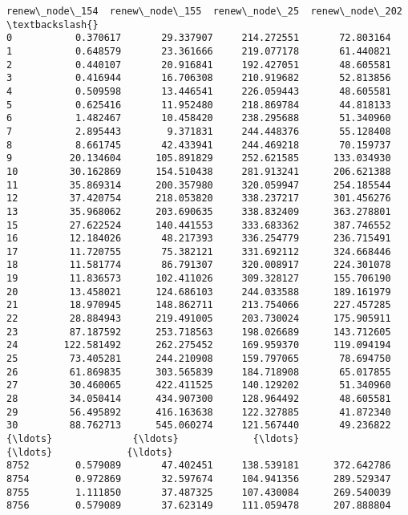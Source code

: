 \documentclass[11pt]{article}
\begin{document}
\begin{Verbatim}[commandchars=\\\{\}]
      renew\_node\_154  renew\_node\_155  renew\_node\_25  renew\_node\_202  \textbackslash{}
0           0.370617       29.337907     214.272551       72.803164   
1           0.648579       23.361666     219.077178       61.440821   
2           0.440107       20.916841     192.427051       48.605581   
3           0.416944       16.706308     210.919682       52.813856   
4           0.509598       13.446541     226.059443       48.605581   
5           0.625416       11.952480     218.869784       44.818133   
6           1.482467       10.458420     238.295688       51.340960   
7           2.895443        9.371831     244.448376       55.128408   
8           8.661745       42.433941     244.469218       70.159737   
9          20.134604      105.891829     252.621585      133.034930   
10         30.162869      154.510438     281.913241      206.621388   
11         35.869314      200.357980     320.059947      254.185544   
12         37.420754      218.053820     338.237217      301.456276   
13         35.968062      203.690635     338.832409      363.278801   
15         27.622524      140.441553     333.683362      387.746552   
16         12.184026       48.217393     336.254779      236.715491   
17         11.720755       75.382121     331.692112      324.668446   
18         11.581774       86.791307     320.008917      224.301078   
19         11.836573      102.411026     309.328127      155.706190   
20         13.458021      124.686103     244.033588      189.161979   
21         18.970945      148.862711     213.754066      227.457285   
22         28.884943      219.491005     203.730024      175.905911   
23         87.187592      253.718563     198.026689      143.712605   
24        122.581492      262.275452     169.959370      119.094194   
25         73.405281      244.210908     159.797065       78.694750   
26         61.869835      303.565839     184.718908       65.017855   
27         30.460065      422.411525     140.129202       51.340960   
28         34.050414      434.907300     128.964492       48.605581   
29         56.495892      416.163638     122.327885       41.872340   
30         88.762713      545.060274     121.567440       49.236822   
{\ldots}              {\ldots}             {\ldots}            {\ldots}             {\ldots}   
8752        0.579089       47.402451     138.539181      372.642786   
8754        0.972869       32.597674     104.941356      289.529347   
8755        1.111850       37.487325     107.430084      269.540039   
8756        0.579089       37.623149     111.059478      207.888804   

\end{Verbatim}
\end{document}
